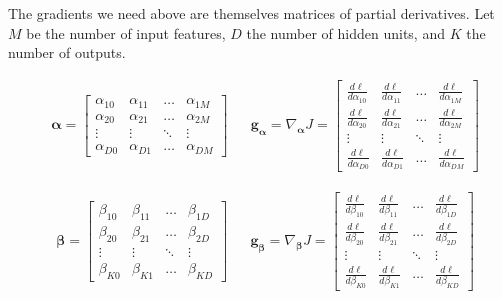 \documentclass[11pt]{article}
\numberwithin{equation}{section} %
\numberwithin{figure}{section} %
\numberwithin{table}{section} %
\newcommand{\adj}[1]{\frac{d \ell}{d #1}}
\newcommand{\gv}{\mathbf{g}}
\newcommand{\alphav     }{\boldsymbol \alpha     }
\newcommand{\betav      }{\boldsymbol \beta      }
\begin{document}
The gradients we need above are themselves matrices of partial derivatives. Let $M$ be the number of input features, $D$ the number of hidden units, and $K$ the number of outputs.

\begin{align}
    &\alphav =
    \begin{bmatrix}
        \alpha_{10} & \alpha_{11} & \dots  & \alpha_{1M} \\
        \alpha_{20} & \alpha_{21} & \dots  & \alpha_{2M} \\
        \vdots      & \vdots      & \ddots & \vdots \\
        \alpha_{D0} & \alpha_{D1} & \dots  & \alpha_{DM}
    \end{bmatrix}
    &&
    \gv_{\alphav} = \nabla_{\alphav} J = 
    \begin{bmatrix}
        \adj{\alpha_{10}} & \adj{\alpha_{11}} & \dots  & \adj{\alpha_{1M}} \\
        \adj{\alpha_{20}} & \adj{\alpha_{21}} & \dots  & \adj{\alpha_{2M}} \\
        \vdots      & \vdots      & \ddots & \vdots \\
        \adj{\alpha_{D0}} & \adj{\alpha_{D1}} & \dots  & \adj{\alpha_{DM}}
    \end{bmatrix}
\end{align}

\begin{align}
    &\betav =
    \begin{bmatrix}
        \beta_{10} & \beta_{11} & \dots  & \beta_{1D} \\
        \beta_{20} & \beta_{21} & \dots  & \beta_{2D} \\
        \vdots      & \vdots      & \ddots & \vdots \\
        \beta_{K0} & \beta_{K1} & \dots  & \beta_{KD}
    \end{bmatrix}
    &&
    \gv_{\betav} = \nabla_{\betav} J = 
    \begin{bmatrix}
        \adj{\beta_{10}} & \adj{\beta_{11}} & \dots  & \adj{\beta_{1D}} \\
        \adj{\beta_{20}} & \adj{\beta_{21}} & \dots  & \adj{\beta_{2D}} \\
        \vdots      & \vdots      & \ddots & \vdots \\
        \adj{\beta_{K0}} & \adj{\beta_{K1}} & \dots  & \adj{\beta_{KD}}
    \end{bmatrix}
\end{align}
\end{document}
